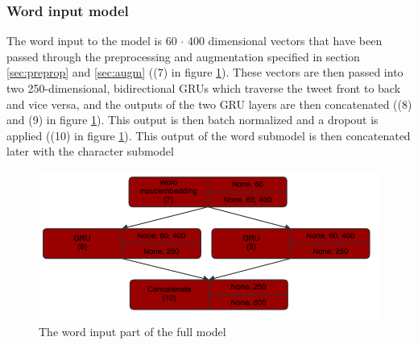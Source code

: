 \subsubsection{Word input model}
The word input to the model is 60  $\cdot$ 400 dimensional vectors that have been passed through the preprocessing and augmentation specified in section \ref{sec:preprop} and \ref{sec:augm} ((7) in figure \ref{fig:wordmodel}). These vectors are then passed into two 250-dimensional, bidirectional GRUs which traverse the tweet front to back and vice versa, and the outputs of the two GRU layers are then concatenated ((8) and (9) in figure \ref{fig:wordmodel}). This output is then batch normalized and a dropout is applied ((10) in figure \ref{fig:wordmodel}). This output of the word submodel is then concatenated later with the character submodel\\
\begin{figure}[H] 
	\centering
		\includegraphics[scale=0.25]{pictures/word_model.png}
		\caption{The word input part of the full model}
		\label{fig:wordmodel}
\end{figure}

